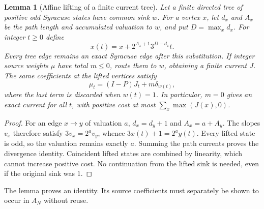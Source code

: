 \documentclass[11pt]{article}
\newtheorem{lemma}[theorem]{Lemma}
\begin{document}
\begin{lemma}[Affine lifting of a finite current tree]\label{lem:affine}
Let a finite directed tree of positive odd Syracuse states have common
sink $w$. For a vertex $x$, let $d_x$ and $A_x$ be the path length and
accumulated valuation to $w$, and put $D=\max_x d_x$. For integer $t\ge0$
define
\[
x(t)=x+2^{A_x+1}3^{D-d_x}t.
\]
Every tree edge remains an exact Syracuse edge after this substitution.
If integer source weights $\mu$ have total $m\le0$, route them to $w$,
obtaining a finite current $J$. The same coefficients at the lifted
vertices satisfy
\[
\mu_t=(I-P)J_t+m\delta_{w(t)},
\]
where the last term is discarded when $w(t)=1$. In particular, $m=0$
gives an exact current for all $t$, with positive cost at most
$\sum_x\max(J(x),0)$.
\end{lemma}
\begin{proof}
For an edge $x\to y$ of valuation $a$,
$d_x=d_y+1$ and $A_x=a+A_y$. The slopes $v_x$ therefore satisfy
$3v_x=2^av_y$, whence $3x(t)+1=2^ay(t)$. Every lifted state is odd,
so the valuation remains exactly $a$. Summing the path currents proves
the divergence identity. Coincident lifted states are combined by
linearity, which cannot increase positive cost. No continuation from the
lifted sink is needed, even if the original sink was $1$.
\end{proof}
The lemma proves an identity. Its source coefficients must separately be
shown to occur in $A_N$ without reuse.
\end{document}
